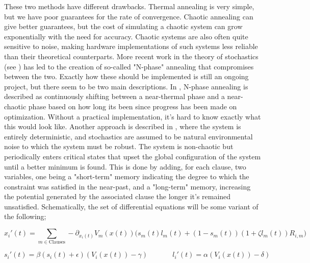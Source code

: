 These two methods have different drawbacks. Thermal annealing is very simple, but we have poor guarantees for the rate of convergence. Chaotic annealing can give better guarantees, but the cost of simulating a chaotic system can grow exponentially with the need for accuracy. Chaotic systems are also often quite sensitive to noise, making hardware implementations of such systems less reliable than their theoretical counterparts. More recent work in the theory of stochastics (see \citep{ovchinnikov2016introduction}) has led to the creation of so-called "N-phase" annealing that compromises between the two. Exactly how these should be implemented is still an ongoing project, but there seem to be two main descriptions. In \citep{ovchinnikov2017stochastic}, N-phase annealing is described as continuously shifting between a near-thermal phase and a near-chaotic phase based on how long its been since progress has been made on optimization. Without a practical implementation, it's hard to know exactly what this would look like. Another approach is described in \citep{di2022memcomputing}, where the system is entirely deterministic, and stochastics are assumed to be natural environmental noise to which the system must be robust. The system is non-chaotic but periodically enters critical states that upset the global configuration of the system until a better minimum is found. This is done by adding, for each clause, two variables, one being a "short-term" memory indicating the degree to which the constraint was satisfied in the near-past, and a "long-term" memory, increasing the potential generated by the associated clause the longer it's remained unsatisfied. Schematically, the set of differential equations will be some variant of the following;

\begin{equation}
    x_i'(t) = \sum_{m \in \text{Clauses}} -\partial_{x_i(t)} V_m(x(t)) \big(s_m(t) l_m(t) + (1 - s_m(t)) (1 + \zeta l_m(t)) R_{i, m}\big)
\end{equation}

\begin{equation}
    s_i'(t) = \beta (s_i(t) + \epsilon) (V_i(x(t)) - \gamma)\ \quad \quad \quad\ l_i'(t) = \alpha (V_i(x(t)) - \delta)
\end{equation}

